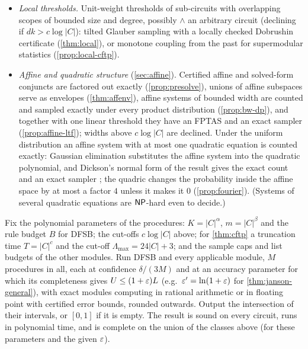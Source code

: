\begin{itemize}
variables lie in at most $d\le2^{c'k}$ clauses, for an absolute constant $c'>0$, admit
FPRASs \cite{moitra2019,fgyz2021,jpv2021,hwy2022}; for $k$-CNFs, $d\lesssim2^{k/4.82}$
suffices up to factors polynomial in $k$ \cite{wangyin2024}. More generally, so do
local CSPs in which every constraint is violated with probability at most $\beta$
and shares variables with at most $\Delta$ others, if $\beta\Delta^{c}\lesssim1$ for
an absolute constant $c$ \cite{fhy2021,jpv2021,hwy2022}. The conditions are
syntactic (for constraints on $O(\log|C|)$ variables, $\beta$ is computed exactly).
\item \emph{Local thresholds.} Unit-weight thresholds of sub-circuits with
overlapping scopes of bounded size and degree, possibly $\wedge$ an arbitrary circuit
(declining if $dk>c\log|C|$): tilted Glauber sampling with a locally checked Dobrushin
certificate (\cref{thm:local}), or monotone coupling from the past for supermodular
statistics (\cref{prop:local-cftp}).
\item \emph{Affine and quadratic structure} (\cref{sec:affine}). Certified affine and
solved-form conjuncts are factored out exactly (\cref{prop:presolve}), unions of affine
subspaces serve as envelopes (\cref{thm:affenv}), affine systems of bounded width are
counted and sampled exactly under every product distribution (\cref{prop:bw-dp}), and
together with one linear threshold they have an FPTAS and an exact sampler
(\cref{prop:affine-ltf}); widths above $c\log|C|$ are declined. Under the uniform
distribution an affine system with at most one quadratic equation is counted exactly:
Gaussian elimination substitutes the affine system into the quadratic polynomial, and
Dickson's normal form of the result gives the exact count and an exact sampler
\cite{ek1990}; the quadric changes the probability inside the affine space by at most
a factor $4$ unless it makes it $0$ (\cref{prop:fourier}). (Systems of several
quadratic equations are $\mathsf{NP}$-hard even to decide.)
\end{itemize}

\begin{theorem}\label{thm:meta}
Fix the polynomial parameters of the procedures: $K=|C|^{\alpha}$, $m=|C|^{\beta}$ and
the rule budget $B$ for DFSB; the cut-offs $c\log|C|$ above; for \cref{thm:cftp} a
truncation time $T=|C|^{c}$ and the cut-off $\Lambda_{\max}=24|C|+3$; and the sample
caps and list budgets of the other modules. Run DFSB and every applicable module,
$M$ procedures in all, each at confidence $\delta/(3M)$ and at an accuracy
parameter for which its completeness gives $U\le(1+\varepsilon)L$ (e.g.\
$\varepsilon'=\ln(1+\varepsilon)$ for \cref{thm:janson-general}), with exact modules computing in
rational arithmetic or in floating point with certified error bounds, rounded
outwards. Output the intersection of their intervals, or $[0,1]$ if it is empty.
The result is sound on every circuit, runs in polynomial time, and is complete on
the union of the classes above (for these parameters and the given $\varepsilon$).
\end{theorem}

